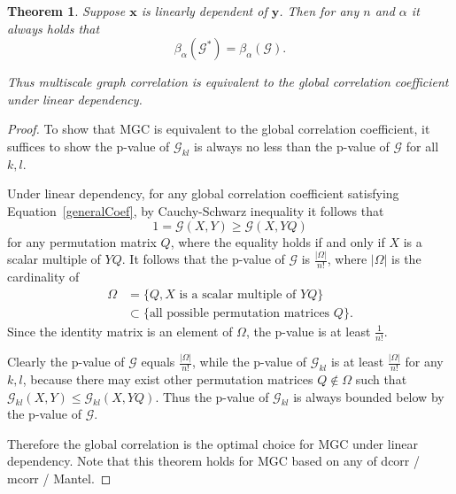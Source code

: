 \documentclass[11pt]{article}
\providecommand{\mb}[1]{\boldsymbol{#1}}
\newcommand{\G}{\mathcal{G}}
\newtheorem{appThm}{Theorem}
\begin{document}
\begin{appThm}
Suppose $\mb{x}$ is linearly dependent of $\mb{y}$. Then for any $n$ and $\alpha$ it always holds that
\begin{equation}
\beta_{\alpha}(\G^{*}) = \beta_{\alpha}(\G).
\end{equation}

Thus multiscale graph correlation is equivalent to the global correlation coefficient under linear dependency.
\end{appThm}
\begin{proof}
To show that MGC is equivalent to the global correlation coefficient, it suffices to show the p-value of $\G_{kl}$ is always no less than the p-value of $\G$ for all $k,l$.

Under linear dependency, for any global correlation coefficient satisfying Equation~\ref{generalCoef}, by Cauchy-Schwarz inequality it follows that
\begin{equation}
1=\G(X, Y) \geq \G(X, YQ)
\end{equation}
for any permutation matrix $Q$, where the equality holds if and only if $X$ is a scalar multiple of $YQ$. It follows that the p-value of $\G$ is $\frac{|\Omega|}{n!}$, where $|\Omega|$ is the cardinality of 
\begin{align*}
\Omega &=\{Q, X \mbox{ is a scalar multiple of }YQ\} \\
&\subset \{\mbox{all possible permutation matrices }Q\}. 
\end{align*}
Since the identity matrix is an element of $\Omega$, the p-value is at least $\frac{1}{n!}$.

Clearly the p-value of $\G$ equals $\frac{|\Omega|}{n!}$, while the p-value of $\G_{kl}$ is at least $\frac{|\Omega|}{n!}$ for any $k,l$, because there may exist other permutation matrices $Q \notin \Omega$ such that $\G_{kl}(X,Y) \leq \G_{kl}(X,YQ)$. Thus the p-value of $\G_{kl}$ is always bounded below by the p-value of $\G$.

Therefore the global correlation is the optimal choice for MGC under linear dependency. Note that this theorem holds for MGC based on any of dcorr / mcorr / Mantel.
\end{proof}
\end{document}
